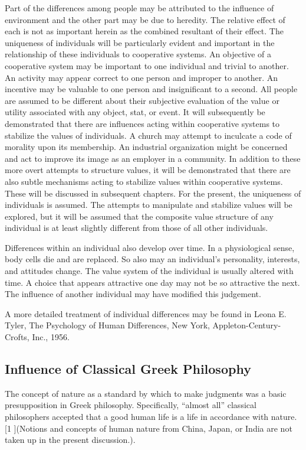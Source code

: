 Part of the differences among people may be attributed to the influence of environment and the other part may be due to heredity. The relative effect of each is not as important herein as the combined resultant of their effect. The uniqueness of individuals will be particularly evident and important in the relationship of these individuals to cooperative systems. An objective of a cooperative system may be important to one individual and trivial to another. An activity may appear correct to one person and improper to another. An incentive may be valuable to one person and insignificant to a second. All people are assumed to be different about their subjective evaluation of the value or utility associated with any object, stat, or event. It will subsequently be demonstrated that there are influences acting within cooperative systems to stabilize the values of individuals. A church may attempt to inculcate a code of morality upon its membership. An industrial organization might be concerned and act to improve its image as an employer in a community. In addition to these more overt attempts to structure values, it will be demonstrated that there are also subtle mechanisms acting to stabilize values within cooperative systems. These will be discussed in subsequent chapters. For the present, the uniqueness of individuals is assumed. The attempts to manipulate and stabilize values will be explored, but it will be assumed that the composite value structure of any individual is at least slightly different from those of all other individuals.

Differences within an individual also develop over time. In a physiological sense, body cells die and are replaced. So also may an individual’s personality, interests, and attitudes change. The value system of the individual is usually altered with time. A choice that appears attractive one day may not be so attractive the next. The influence of another individual may have modified this judgement.

A more detailed treatment of individual differences may be found in Leona E. Tyler, The Psychology of Human Differences, New York, Appleton-Century-Crofts, Inc., 1956. 

\subsection{Influence of Classical Greek Philosophy}

The concept of nature as a standard by which to make judgments was a basic presupposition in Greek philosophy. Specifically, ``almost all'' classical philosophers accepted that a good human life is a life in accordance with nature.[1 ](Notions and concepts of human nature from China, Japan, or India are not taken up in the present discussion.).

